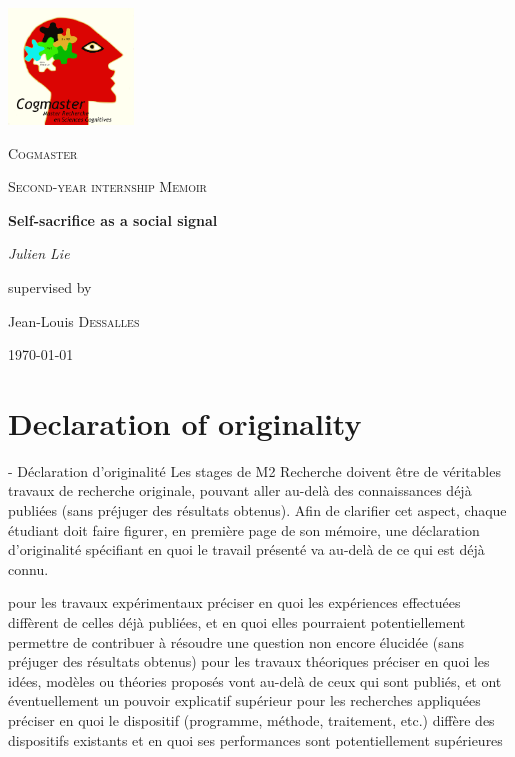 \documentclass[a4paper,12pt]{report}
\begin{document}
\setlength{\parindent}{0pt}
\setlength{\parskip}{6pt}

\begin{titlepage}
	\centering
    \includegraphics[width=0.25\textwidth]{cogmaster}\par\vspace{1cm}
	{\scshape\LARGE Cogmaster \par}
	\vspace{1cm}
	{\scshape\Large Second-year internship Memoir\par}
	\vspace{1.5cm}
	{\huge\bfseries Self-sacrifice as a social signal\par}
	\vspace{2cm}
	{\Large\itshape Julien Lie\par}
	\vfill
	supervised by\par
	Jean-Louis \textsc{Dessalles}

	\vfill

	{\large \today\par}
\end{titlepage}



\tableofcontents\newpage{}

\part{Declaration of originality}
- Déclaration d'originalité
Les stages de M2 Recherche doivent être de véritables travaux de recherche originale, pouvant aller au-delà des connaissances déjà publiées (sans préjuger des résultats obtenus). Afin de clarifier cet aspect, chaque étudiant doit faire figurer, en première page de son mémoire, une déclaration d'originalité spécifiant en quoi le travail présenté va au-delà de ce qui est déjà connu.

    pour les travaux expérimentaux
        préciser en quoi les expériences effectuées diffèrent de celles déjà publiées, et en quoi elles pourraient potentiellement permettre de contribuer à résoudre une question non encore élucidée (sans préjuger des résultats obtenus)
    pour les travaux théoriques
        préciser en quoi les idées, modèles ou théories proposés vont au-delà de ceux qui sont publiés, et ont éventuellement un pouvoir explicatif supérieur
    pour les recherches appliquées
        préciser en quoi le dispositif (programme, méthode, traitement, etc.) diffère des dispositifs existants et en quoi ses performances sont potentiellement supérieures
\end{document}

